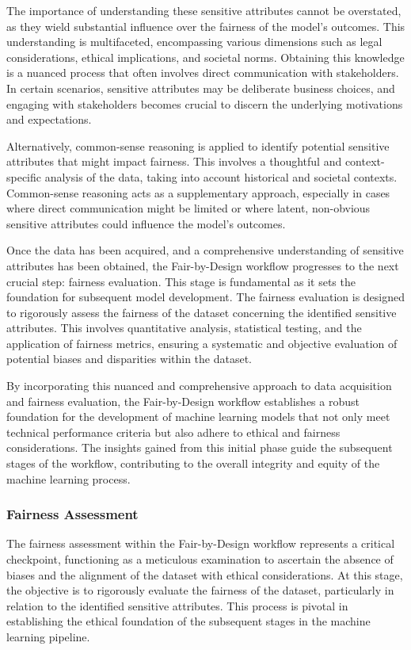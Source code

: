 \documentclass[12pt,a4paper,openright,twoside]{book}
\begin{document}
The importance of understanding these sensitive attributes cannot be overstated, as they wield substantial influence over the fairness of the model's outcomes. This understanding is multifaceted, encompassing various dimensions such as legal considerations, ethical implications, and societal norms. Obtaining this knowledge is a nuanced process that often involves direct communication with stakeholders. In certain scenarios, sensitive attributes may be deliberate business choices, and engaging with stakeholders becomes crucial to discern the underlying motivations and expectations.

Alternatively, common-sense reasoning is applied to identify potential sensitive attributes that might impact fairness. This involves a thoughtful and context-specific analysis of the data, taking into account historical and societal contexts. Common-sense reasoning acts as a supplementary approach, especially in cases where direct communication might be limited or where latent, non-obvious sensitive attributes could influence the model's outcomes.

Once the data has been acquired, and a comprehensive understanding of sensitive attributes has been obtained, the Fair-by-Design workflow progresses to the next crucial step: fairness evaluation. This stage is fundamental as it sets the foundation for subsequent model development. The fairness evaluation is designed to rigorously assess the fairness of the dataset concerning the identified sensitive attributes. This involves quantitative analysis, statistical testing, and the application of fairness metrics, ensuring a systematic and objective evaluation of potential biases and disparities within the dataset.

By incorporating this nuanced and comprehensive approach to data acquisition and fairness evaluation, the Fair-by-Design workflow establishes a robust foundation for the development of machine learning models that not only meet technical performance criteria but also adhere to ethical and fairness considerations. The insights gained from this initial phase guide the subsequent stages of the workflow, contributing to the overall integrity and equity of the machine learning process.

\subsubsection{Fairness Assessment}

The fairness assessment within the Fair-by-Design workflow represents a critical checkpoint, functioning as a meticulous examination to ascertain the absence of biases and the alignment of the dataset with ethical considerations. At this stage, the objective is to rigorously evaluate the fairness of the dataset, particularly in relation to the identified sensitive attributes. This process is pivotal in establishing the ethical foundation of the subsequent stages in the machine learning pipeline.
\end{document}
